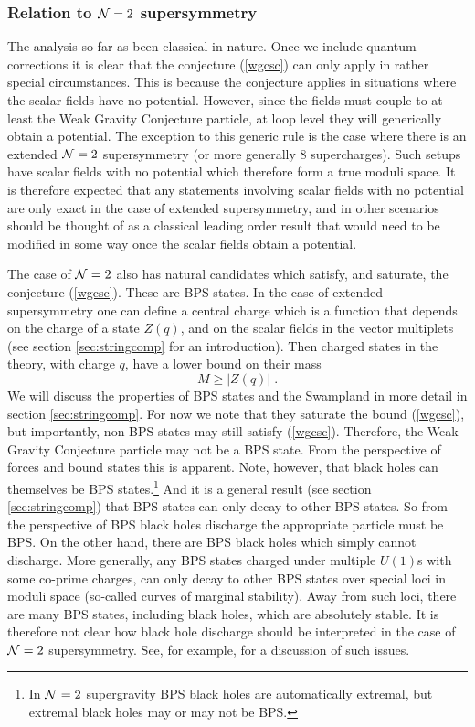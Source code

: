 \documentclass[11pt,a4paper]{article}
\numberwithin{equation}{section}
\numberwithin{table}{section}\setlength{\multlinegap}{25pt}
\newcommand{\be}{\begin{equation}}
\newcommand{\ee}{\end{equation}}
\begin{document}
\subsubsection*{Relation to ${\cal N}=2$ supersymmetry}

The analysis so far as been classical in nature. Once we include quantum corrections it is clear that the conjecture (\ref{wgcsc}) can only apply in rather special circumstances. This is because the conjecture applies in situations where the scalar fields have no potential. However, since the fields must couple to at least the Weak Gravity Conjecture particle, at loop level they will generically obtain a potential. The exception to this generic rule is the case where there is an extended ${\cal N}=2$ supersymmetry (or more generally 8 supercharges). Such setups have scalar fields with no potential which therefore form a true moduli space. It is therefore expected that any statements involving scalar fields with no potential are only exact in the case of extended supersymmetry, and in other scenarios should be thought of as a classical leading order result that would need to be modified in some way once the scalar fields obtain a potential. 

The case of ${\cal N}=2$ also has natural candidates which satisfy, and saturate, the conjecture (\ref{wgcsc}). These are BPS states. In the case of extended supersymmetry one can define a central charge which is a function that depends on the charge of a state $Z\left(q\right)$, and on the scalar fields in the vector multiplets (see section \ref{sec:stringcomp} for an introduction). Then charged states in the theory, with charge $q$, have a lower bound on their mass
\be
\label{bpsboundsim}
M \geq \left|Z\left(q\right)\right| \;.
\ee
We will discuss the properties of BPS states and the Swampland in more detail in section \ref{sec:stringcomp}. For now we note that they saturate the bound (\ref{wgcsc}), but importantly, non-BPS states may still satisfy (\ref{wgcsc}). Therefore, the Weak Gravity Conjecture particle may not be a BPS state. From the perspective of forces and bound states this is apparent. Note, however, that black holes can themselves be BPS states.\footnote{In ${\cal N}=2$ supergravity BPS black holes are automatically extremal, but extremal black holes may or may not be BPS.} And it is a general result (see section \ref{sec:stringcomp}) that BPS states can only decay to other BPS states. So from the perspective of BPS black holes discharge the appropriate particle must be BPS. On the other hand, there are BPS black holes which simply cannot discharge. More generally, any BPS states charged under multiple $U(1)$s with some co-prime charges, can only decay to other BPS states over special loci in moduli space (so-called curves of marginal stability). Away from such loci, there are many BPS states, including black holes, which are absolutely stable. It is therefore not clear how black hole discharge should be interpreted in the case of ${\cal N}=2$ supersymmetry. See, for example, \cite{ArkaniHamed:2006dz,Palti:2017elp} for a discussion of such issues.
\end{document}
